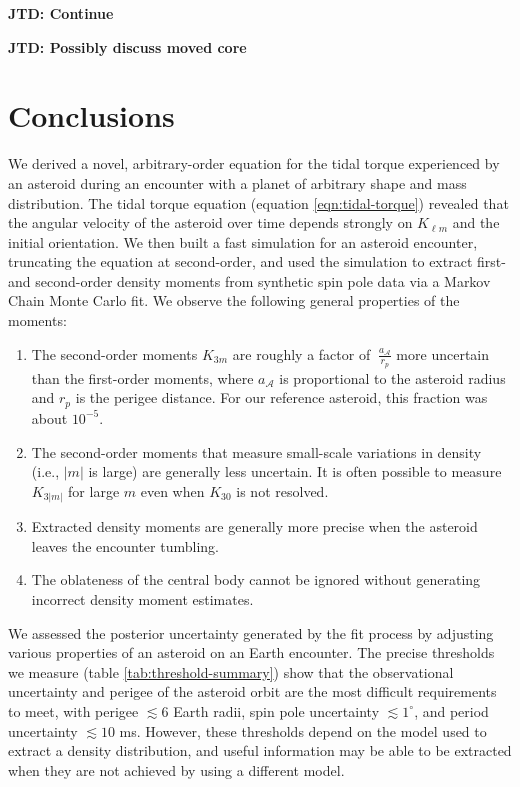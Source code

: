 \documentclass[fleqn,usenatbib]{mnras}
\newcommand{\jtd}[1]{ {\bf{\color{red} JTD: #1}} }
\begin{document}
\jtd{Continue}

\jtd{Possibly discuss moved core}

\section{Conclusions}

We derived a novel, arbitrary-order equation for the tidal torque experienced by an asteroid during an encounter with a planet of arbitrary shape and mass distribution. The tidal torque equation (equation \ref{eqn:tidal-torque}) revealed that the angular velocity of the asteroid over time depends strongly on $K_{\ell m}$ and the initial orientation. We then built a fast simulation for an asteroid encounter, truncating the equation at second-order, and used the simulation to extract first- and second-order density moments from synthetic spin pole data via a Markov Chain Monte Carlo fit. We observe the following general properties of the moments:
\begin{enumerate}
  \item The second-order moments $K_{3m}$ are roughly a factor of $~\frac{a_\mathcal{A}}{r_p}$ more uncertain than the first-order moments, where $a_\mathcal{A}$ is proportional to the asteroid radius and $r_p$ is the perigee distance. For our reference asteroid, this fraction was about $10^{-5}$.
  \item The second-order moments that measure small-scale variations in density (i.e., $|m|$ is large) are generally less uncertain. It is often possible to measure $K_{3|m|}$ for large $m$ even when $K_{30}$ is not resolved.
  \item Extracted density moments are generally more precise when the asteroid leaves the encounter tumbling.
  \item The oblateness of the central body cannot be ignored without generating incorrect density moment estimates.
\end{enumerate}

We assessed the posterior uncertainty generated by the fit process by adjusting various properties of an asteroid on an Earth encounter. The precise thresholds we measure (table \ref{tab:threshold-summary}) show that the observational uncertainty and perigee of the asteroid orbit are the most difficult requirements to meet, with perigee $\lesssim 6$ Earth radii, spin pole uncertainty $\lesssim 1^\circ$, and period uncertainty $\lesssim 10$ ms. However, these thresholds depend on the model used to extract a density distribution, and useful information may be able to be extracted when they are not achieved by using a different model.
\end{document}
